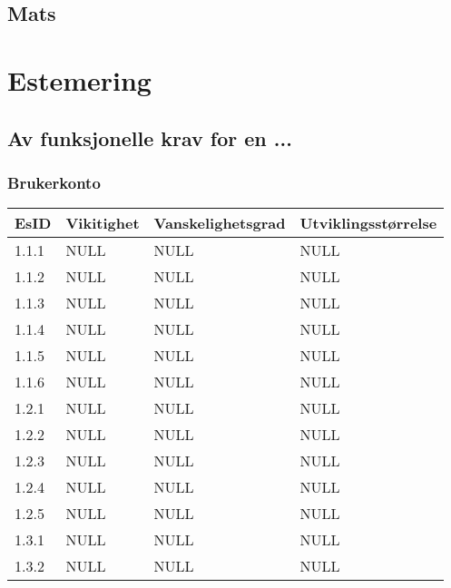 \documentclass[12pt]{article}
\begin{document}
    \subsection{Mats}

\section{Estemering}

    \subsection{Av funksjonelle krav for en ...}

        \subsubsection{Brukerkonto}
        \begin{tabular}{|p{2cm}|p{4cm}|p{4cm}|p{4cm}| } 
            \hline
            \bf EsID & \bf Vikitighet & \bf Vanskelighetsgrad & \bf Utviklingsstørrelse\\
            \hline
            1.1.1 & NULL & NULL & NULL\\
            \hline
            1.1.2 & NULL & NULL & NULL\\
            \hline
            1.1.3 & NULL & NULL & NULL\\
            \hline
            1.1.4 & NULL & NULL & NULL\\
            \hline
            1.1.5 & NULL & NULL & NULL\\
            \hline
            1.1.6 & NULL & NULL & NULL\\
            \hline
            1.2.1 & NULL & NULL & NULL\\
            \hline
            1.2.2 & NULL & NULL & NULL\\
            \hline
            1.2.3 & NULL & NULL & NULL\\
            \hline
            1.2.4 & NULL & NULL & NULL\\
            \hline
            1.2.5 & NULL & NULL & NULL\\
            \hline
            1.3.1 & NULL & NULL & NULL\\
            \hline
            1.3.2 & NULL & NULL & NULL\\
            \hline
        \end{tabular}
    
\end{document}

